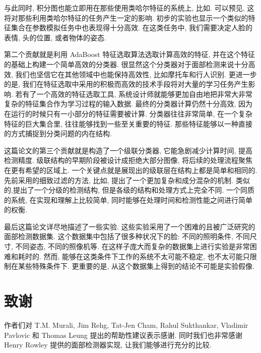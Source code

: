 \documentclass[a4paper,utf8,11pt, onecolumn]{ctexart}
\begin{document}
与此同时, 积分图也能立即用在那些使用类哈尔特征的系统上, 比如\citet{papageorgiou1998general}. 可以预见, 这将对那些利用类哈尔特征的任务产生一定的影响. 初步的实验也显示一个类似的特征集合在参数模拟任务中也表现得十分高效. 在这类任务中, 我们需要决定人脸的表情, 头的位置, 或者物体的姿态.

第二个贡献就是利用 AdaBoost 特征选取算法选取计算高效的特征, 并在这个特征的基础上构建一个简单高效的分类器. 很显然这个分类器对于面部检测来说十分高效, 我们也坚信它在其他领域中也能保持高效性, 比如摩托车和行人识别. 更进一步的是, 我们在特征选取中采用的积极而高效的技术手段将对大量的学习任务产生影响. 若有了一个高效的特征选取工具, 系统设计师就能够更加自由地把非常大非常复杂的特征集合作为学习过程的输入数据.
最终的分类器计算仍然十分高效, 因为在运行的时候只有一小部分的特征需要被计算. 分类器往往非常简单, 在一个复杂特征的巨大集合里, 往往能够找到一些至关重要的特征. 那些特征能够以一种直接的方式捕捉到分类问题的内在结构.

这篇论文的第三个贡献就是构造了一个级联分类器, 它能急剧减少计算时间, 提高检测精度. 级联结构的早期阶段被设计成拒绝大部分图像, 将后续的处理流程聚焦在更有希望的区域上. 一个关键点就是展现出的级联层在结构上都是简单和相同的.
先前采用的细致过滤的方法, 比如\citet{itti1998model}, 提出了一个更加复杂和成分混杂的机制. 类似的,\citet{amit1999computational}提出了一个分级的检测结构, 但是各级的结构和处理方式上完全不同. 一个同质的系统, 在实现和理解上比较简单, 同时能够在处理时间和检测性能之间进行简单的权衡.

最后这篇论文详尽地描述了一些实验. 这些实验采用了一个困难的且被广泛研究的面部检测数据集. 这个数据集中包括了很多种状况下的脸: 不同的照明条件, 不同尺寸, 不同姿态, 不同的照像机等. 在这样子庞大而复杂的数据集上进行实验是非常困难和耗时的. 然而, 能够在这类条件下工作的系统不太可能不稳定, 也不太可能只限制在某些特殊条件下. 更重要的是, 从这个数据集上得到的结论不可能是实验假像.
\section{致谢}
作者们对 T.M. Murali, Jim Rehg, Tat-Jen Cham, Rahul Sukthankar, Vladimir Pavlovic 和 Thomas Leung 提出的帮助性建议表示感谢. 同时我们也非常感谢 Henry Rowley 提供的面部检测器实现, 让我们能够进行充分的比较.

\end{document}
